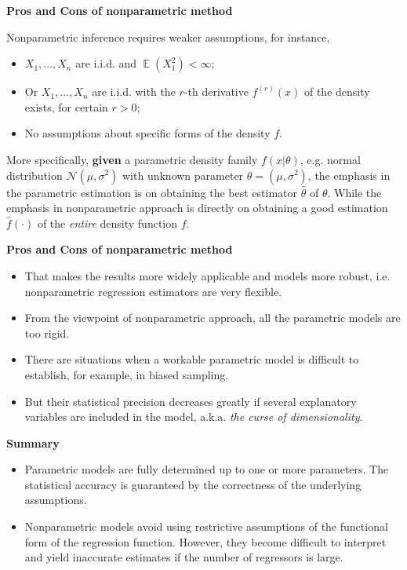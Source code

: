 \documentclass[19pt,landscaoe]{article}
\DeclareMathOperator{\E}{\mathbb{E}}
\begin{document}
\newpage
{\LARGE\centerline{\textbf{Pros and Cons of nonparametric method}}}
\vskip25pt
\begin{minipage}{.9\textwidth}
    \Large

Nonparametric inference requires weaker assumptions, for instance, 
\vfill
\begin{itemize}
\item $X_1,\dots,X_n$ are i.i.d. and $\E(X_1^2)<\infty$;
\item Or $X_1,\dots,X_n$ are i.i.d. with the $r$-th derivative $f^{(r)}(x)$ of the density exists, for certain $r>0$;
\item No assumptions about specific forms of the density $f$.
\end{itemize}
More specifically, {\bf given} a parametric density family $f(x|\theta)$, e.g. normal distribution $\mathcal{N}(\mu,\sigma^2)$ with unknown parameter $\theta=(\mu,\sigma^2)$, the emphasis in the parametric estimation is on obtaining the best estimator $\hat{\theta}$ of $\theta$. While the emphasis in nonparametric approach is directly on obtaining a good estimation $\hat{f}(\cdot)$ of the {\it entire} density function $f$.
\end{minipage}

\newpage
{\LARGE\centerline{\textbf{Pros and Cons of nonparametric method}}}
\vskip25pt
\begin{minipage}{.9\textwidth}
    \Large
\begin{itemize}
\item That makes the results more widely applicable and models more robust, i.e. nonparametric regression estimators are very flexible.
\item From the viewpoint of nonparametric approach, all the parametric models are too rigid. 
\item There are situations when a workable parametric model is difficult to establish, for example, in biased sampling. 
\item But their statistical precision decreases greatly if several explanatory variables are included in the model, a.k.a. {\it the curse of dimensionality}.
\end{itemize}

\end{minipage}

\newpage
{\LARGE\centerline{\textbf{Summary}}}
\vskip25pt
\begin{minipage}{.9\textwidth}
    \Large
\begin{itemize}
\item Parametric models are fully determined up to one or more parameters. The statistical accuracy is guaranteed by the correctness of the underlying assumptions. 
\item Nonparametric models avoid using restrictive assumptions of the functional form of the regression function. However, they become difficult to interpret and yield inaccurate estimates if the number of regressors is large. 
\end{itemize}

\end{minipage}
\end{document}
